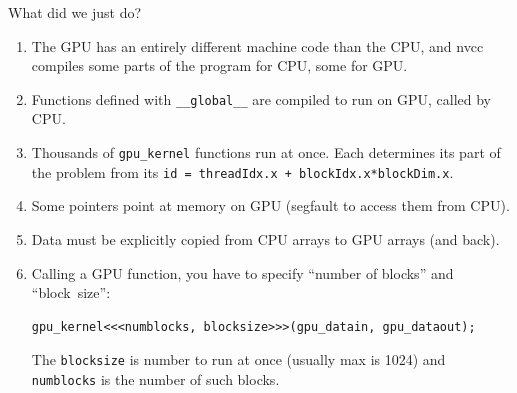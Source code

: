 \documentclass[aspectratio=169]{beamer}
\begin{document}

\begin{frame}[fragile]{What did we just do?}
\vspace{0.5 cm}
\begin{enumerate}
\item The GPU has an entirely different machine code than the CPU, and nvcc compiles some parts of the program for CPU, some for GPU.
\item Functions defined with {\small\tt \_\_global\_\_} are compiled to run on GPU, called by CPU.
\item Thousands of {\small\tt gpu\_kernel} functions run at once. Each determines its part of the problem from its {\small\tt id = threadIdx.x + blockIdx.x*blockDim.x}.
\item Some pointers point at memory on GPU (segfault to access them from CPU).
\item Data must be explicitly copied from CPU arrays to GPU arrays (and back).
\item Calling a GPU function, you have to specify ``number of blocks'' and \mbox{``block size'':\hspace{-0.5 cm}}
\small
\vspace{0.25 cm}
\begin{verbatim}
gpu_kernel<<<numblocks, blocksize>>>(gpu_datain, gpu_dataout);
\end{verbatim}

\vspace{0.25 cm}
\normalsize
The {\small\tt blocksize} is number to run at once (usually max is 1024) and {\small\tt numblocks} is the number of such blocks.
\end{enumerate}
\end{frame}
\end{document}
